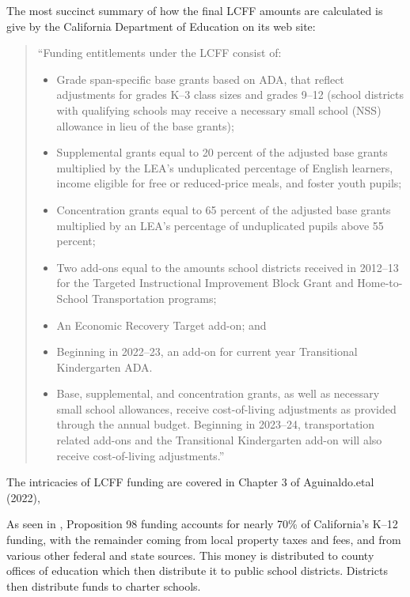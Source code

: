 The most succinct summary of how the final LCFF amounts are calculated is give by the California Department of Education on its web site:
\begin{quotation}
  \noindent{}``Funding entitlements under the LCFF consist of:
  \begin{itemize}
    \item Grade span-specific base grants based on ADA, that reflect adjustments for grades K–3 class sizes and grades 9–12 (school districts with qualifying schools may receive a necessary small school (NSS) allowance in lieu of the base grants);
    \item Supplemental grants equal to 20 percent of the adjusted base grants multiplied by the LEA’s unduplicated percentage of English learners, income eligible for free or reduced-price meals, and foster youth pupils;
    \item Concentration grants equal to 65 percent of the adjusted base grants multiplied by an LEA’s percentage of unduplicated pupils above 55 percent;
    \item Two add-ons equal to the amounts school districts received in 2012–13 for the Targeted Instructional Improvement Block Grant and Home-to-School Transportation programs;
    \item An Economic Recovery Target add-on; and
    \item Beginning in 2022–23, an add-on for current year Transitional Kindergarten ADA.
    \item Base, supplemental, and concentration grants, as well as necessary small school allowances, receive cost-of-living adjustments as provided through the annual budget. Beginning in 2023–24, transportation related add-ons and the Transitional Kindergarten add-on will also receive cost-of-living adjustments.''
  \end{itemize} \parencite{CADept.OfEd.2023}
\end{quotation}

The intricacies of LCFF funding are covered in Chapter 3 of Aguinaldo.etal (2022), %

As seen in , Proposition 98 funding accounts for nearly 70\% of California's K–12 funding, with the remainder coming from local property taxes and fees, and from various other federal and state sources. This money is distributed to county offices of education which then distribute it to public school districts. Districts then distribute funds to charter schools.

